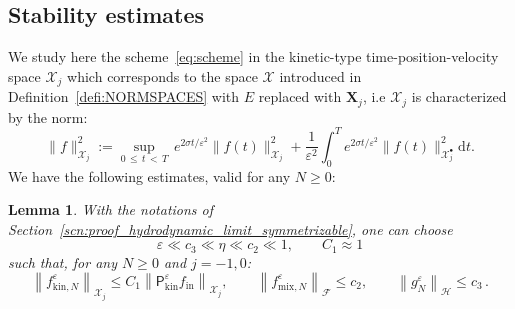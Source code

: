 \documentclass[10pt]{amsart}
\newtheorem{lemm}[theo]{Lemma}\newtheorem{prop}[theo]{Proposition}\newtheorem{coro}[theo]{Corollary}\newtheorem{conj}[theo]{Conjecture}
\theoremstyle{definition}\newtheorem{defi}[theo]{Definition}\newtheorem{rema}[theo]{Remark}\newtheorem{exam}[theo]{Example}\newtheorem{exem}[theo]{Example}\newtheorem{nota}[theo]{Notation}
\newcommand{\ini}{\mathrm{in}}
\newcommand{\mix}{\mathrm{mix}}
\newcommand{\kin}{\mathrm{kin}}
\renewcommand{\d}{\mathrm{d}}
\newcommand{\XX}{\mathcal{X}}
\newcommand{\PP}{\mathsf{P}}
\newcommand{\FFF}{\mathscr{F}}
\newcommand{\HHH}{\mathscr{H}}
\newcommand{\GGG}{\mathscr{X}}
\newcommand{\SSSs}{\HHH}
\newcommand{\SSSl}{\GGG}
\newcommand{\Sh}{\bm{X}}
\newcommand{\SSh}{\bm{\XX}}
\newcommand{\SShp}{\bm{\XX}^{\bullet}}
\newcommand{\SSSh}{\pmb{\GGG}}
\newcommand{\SSSm}{\FFF}
\renewcommand*\le{\leqslant}
\renewcommand*\ge{\geqslant}
\renewcommand*\geq{\geqslant}
\newcommand*\eps{{\varepsilon}}
\begin{document}
\subsection{Stability estimates}

We study here the scheme~\eqref{eq:scheme} in the kinetic-type time-position-velocity space $\SSSh_j$ which corresponds to the space $\SSSl$ introduced in Definition~\ref{defi:NORMSPACES} with $E$ replaced with $\Sh_{j}$, i.e $\SSSh_j$ is characterized by the norm:
\begin{equation}\label{eq:defiTildeSSSl}
\| f \|_{ \SSSh_j}^2 := \sup_{0\,\le\,t\,<\,T} \, e^{2 \sigma t / \eps^2 } \| f(t) \|_{\SSh_j}^2 + \frac{1}{\eps^2} \int_0^T e^{2 \sigma t / \eps^2} \| f(t) \|_{\SShp_{j}}^2 \d t.
\end{equation}
We have the following estimates, valid for any $N\geq0$:

\begin{lemm}\label{lem:stable-scheme}
With the notations of Section~\ref{scn:proof_hydrodynamic_limit_symmetrizable}, one can choose
\[
\eps \ll c_3 \ll \eta \ll c_2 \ll 1, \qquad C_1 \approx 1
\]
such that, for any $N \ge 0$ and $j = -1, 0$:
\begin{equation}\label{eq:inductive_stability}
\left\| f^\eps_{\kin, N}\right\|_{\SSSh_j} \le C_1 \left\| \PP^\eps_\kin f_\ini \right\|_{ \SSh_j}, \qquad \left\| f^\eps_{\mix,N} \right\|_{\SSSm} \le c_2, \qquad \left\| g^\eps_N \right\|_{\SSSs} \le c_3\,.
\end{equation}
\end{lemm}
\end{document}
